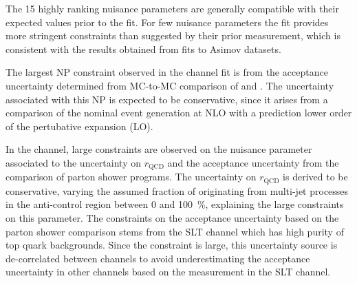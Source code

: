 The 15 highly ranking nuisance parameters are generally compatible
with their expected values prior to the fit. For few nuisance
parameters the fit provides more stringent constraints than suggested
by their prior measurement, which is consistent with the results
obtained from fits to Asimov datasets.

The largest NP constraint observed in the \hadhad channel fit is from
the \ZHF acceptance uncertainty determined from MC-to-MC comparison of
\SHERPA and \MGNLOPY. The uncertainty associated with this NP is
expected to be conservative, since it arises from a comparison of the
nominal event generation at NLO with a prediction lower order of the
pertubative expansion (LO).

In the \lephad channel, large constraints are observed on the nuisance
parameter associated to the uncertainty on $r_{\text{QCD}}$ and the
\ttbar acceptance uncertainty from the comparison of parton shower
programs. The uncertainty on $r_{\text{QCD}}$ is derived to be
conservative, varying the assumed fraction of \faketauhadvis
originating from multi-jet processes in the anti-\tauhadvis control
region between 0 and \SI{100}{\percent}, explaining the large
constraints on this parameter. The constraints on the \ttbar
acceptance uncertainty based on the parton shower comparison stems
from the \lephad SLT channel which has high purity of top quark
backgrounds. Since the constraint is large, this uncertainty source is
de-correlated between channels to avoid underestimating the acceptance
uncertainty in other channels based on the measurement in the \lephad
SLT channel.

